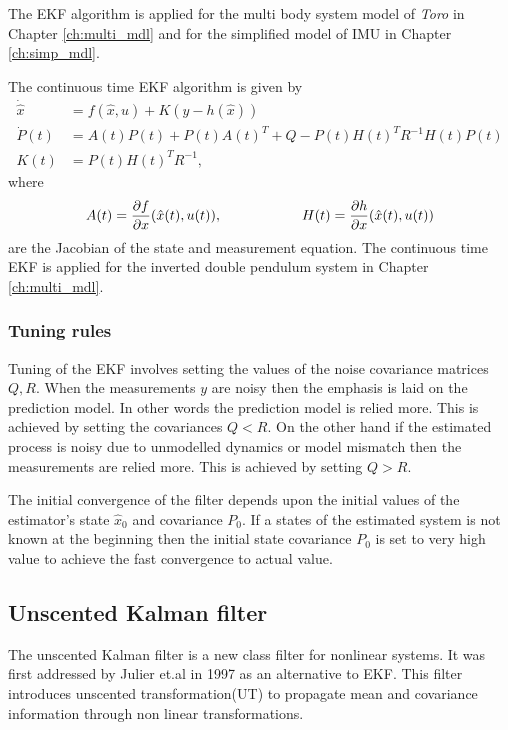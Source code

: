 The EKF algorithm is applied for the multi body system model of \emph{Toro} in Chapter \ref{ch:multi_mdl} and for the simplified model of IMU in Chapter \ref{ch:simp_mdl}.

The continuous time EKF algorithm is given by \citep{gel74}
\begin{equation}
    \label{eq:ekf_con}
    \begin{split}
        \dot {\hat x} &= f(\hat x,u) + K ( y-h(\hat x))\\
        \dot P(t) &= A(t)P(t) + P(t)A(t)^T + Q - P(t)H(t)^TR^{-1}H(t)P(t)\\
        K(t) &= P(t)H(t)^TR^{-1},
    \end{split}
\end{equation}
where $$A(t) = \frac{\partial {f}}{\partial {x}}(\hat x(t), u(t)), \hspace{2cm} H(t) = \frac{\partial {h}}{\partial {x}} (\hat x(t), u(t))$$ are the Jacobian of the state and measurement equation. The continuous time EKF is applied for the inverted double pendulum system in Chapter \ref{ch:multi_mdl}.

\subsubsection{Tuning rules}
\label{subsec:tune_ekf}
Tuning of the EKF involves setting the values of the noise covariance matrices $Q,R$. When the measurements $y$ are noisy then the emphasis is laid on the prediction model. In other words the prediction model is relied more. This is achieved by setting the covariances $Q<R$. On the other hand if the estimated process is noisy due to unmodelled dynamics or model mismatch then the measurements are relied more. This is achieved by setting $Q>R$.

The initial convergence of the filter depends upon the initial values of the estimator's state $\hat x_0$ and covariance $P_0$. If a states of the estimated system is not known at the beginning then the initial state covariance $P_0$ is set to very high value to achieve the fast convergence to actual value.

\subsection{Unscented Kalman filter}
The unscented Kalman filter is a new class filter for nonlinear systems. It was first addressed by Julier et.al in 1997 \citep{jul97} as an alternative to EKF. This filter introduces unscented transformation(UT) to propagate mean and covariance information through non linear transformations.

